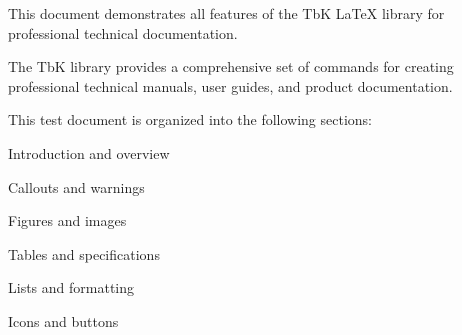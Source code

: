 \documentclass[11pt,a4paper]{article}
\begin{document}



\tbkTableOfContents[
  title = {Contents},
  depth = 4,
]



This document demonstrates all features of the TbK LaTeX library for professional technical documentation.


The TbK library provides a comprehensive set of commands for creating professional technical manuals, user guides, and product documentation.


This test document is organized into the following sections:

\begin{tbkList}[bullet=arrow]
  \item Introduction and overview
  \item Callouts and warnings
  \item Figures and images
  \item Tables and specifications
  \item Lists and formatting
  \item Icons and buttons
\end{tbkList}


\begin{tbkSpecTable}[caption={Document Versions}, label=tbl:versions]
\end{tbkSpecTable}

\end{document}
